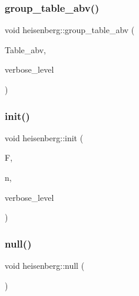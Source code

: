 \mbox{\label{classheisenberg_aaabd8b71c8358a32f89a0ee59470a7b3}} 
\subsubsection{\texorpdfstring{group\+\_\+table\+\_\+abv()}{group\_table\_abv()}}
{\footnotesize\ttfamily void heisenberg\+::group\+\_\+table\+\_\+abv (\begin{DoxyParamCaption}\item[{\mbox{\hyperlink{galois_8h_a09fddde158a3a20bd2dcadb609de11dc}{I\+NT}} $\ast$\&}]{Table\+\_\+abv,  }\item[{\mbox{\hyperlink{galois_8h_a09fddde158a3a20bd2dcadb609de11dc}{I\+NT}}}]{verbose\+\_\+level }\end{DoxyParamCaption})}

\mbox{\label{classheisenberg_ab45bf633370b097f5500a8499b165151}} 
\subsubsection{\texorpdfstring{init()}{init()}}
{\footnotesize\ttfamily void heisenberg\+::init (\begin{DoxyParamCaption}\item[{\mbox{\hyperlink{classfinite__field}{finite\+\_\+field}} $\ast$}]{F,  }\item[{\mbox{\hyperlink{galois_8h_a09fddde158a3a20bd2dcadb609de11dc}{I\+NT}}}]{n,  }\item[{\mbox{\hyperlink{galois_8h_a09fddde158a3a20bd2dcadb609de11dc}{I\+NT}}}]{verbose\+\_\+level }\end{DoxyParamCaption})}

\mbox{\label{classheisenberg_ab448e495e2824699ceb3315371234646}} 
\subsubsection{\texorpdfstring{null()}{null()}}
{\footnotesize\ttfamily void heisenberg\+::null (\begin{DoxyParamCaption}{ }\end{DoxyParamCaption})}

